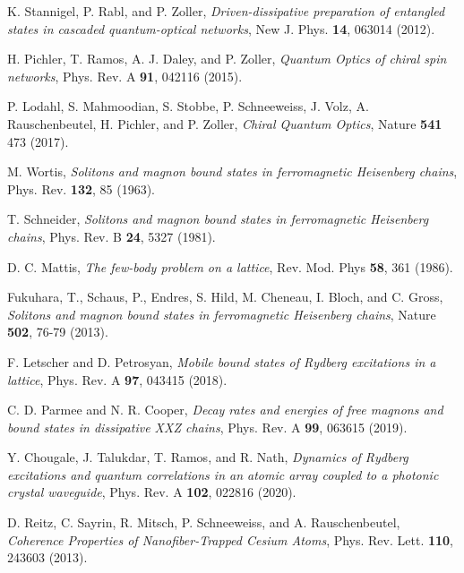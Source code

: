 \documentclass[pra,twocolumn,showpacs,preprintnumbers,amsmath,amssymb]{revtex4-1}
\begin{document}
\begin{thebibliography}{99}
 K. Stannigel, P. Rabl, and P. Zoller, \textit{Driven-dissipative preparation of entangled states in cascaded quantum-optical networks}, New J. Phys. {\bf 14}, 063014 (2012). 

 H. Pichler,  T. Ramos, A. J. Daley, and P. Zoller, \textit{Quantum Optics of chiral spin networks},  Phys. Rev. A   {\bfseries 91}, 042116 (2015).

 P. Lodahl, S. Mahmoodian, S. Stobbe, P. Schneeweiss, J. Volz, A. Rauschenbeutel, H. Pichler, and P. Zoller, \textit{Chiral Quantum Optics}, Nature {\bf 541} 473 (2017).






 M. Wortis,  \textit{Solitons and magnon bound states in ferromagnetic Heisenberg chains},   
Phys. Rev.  {\bf 132}, 85 (1963). 

 T. Schneider,  \textit{Solitons and magnon bound states in ferromagnetic Heisenberg chains},   
Phys. Rev. B  {\bf 24}, 5327 (1981).  

 D. C. Mattis, \textit{The few-body problem on a lattice},  Rev. Mod. Phys {\bfseries 58}, 361 (1986).

 Fukuhara, T., Schaus, P., Endres, S. Hild, M. Cheneau, I. Bloch, and C. Gross, \textit{Solitons and magnon bound states in ferromagnetic Heisenberg chains},   Nature  {\bf 502}, 76-79  (2013). 





 F. Letscher and D. Petrosyan, \textit{Mobile bound states of Rydberg excitations in a lattice},  Phys. Rev. A   {\bfseries 97}, 043415 (2018).

 C. D. Parmee  and N. R. Cooper, \textit{Decay rates and energies of free magnons and bound states in dissipative XXZ chains},  Phys. Rev. A   {\bfseries 99}, 063615 (2019).

 Y. Chougale, J. Talukdar,  T. Ramos, and R. Nath, \textit{Dynamics of Rydberg excitations and quantum correlations in an atomic array coupled to a photonic crystal waveguide},  Phys. Rev. A {\bfseries 102}, 022816 (2020).







 D. Reitz, C. Sayrin, R. Mitsch, P. Schneeweiss, and A. Rauschenbeutel, \textit{Coherence Properties of Nanofiber-Trapped Cesium Atoms}, Phys. Rev. Lett. {\bf 110}, 243603 (2013). %


\end{thebibliography}
\end{document}
